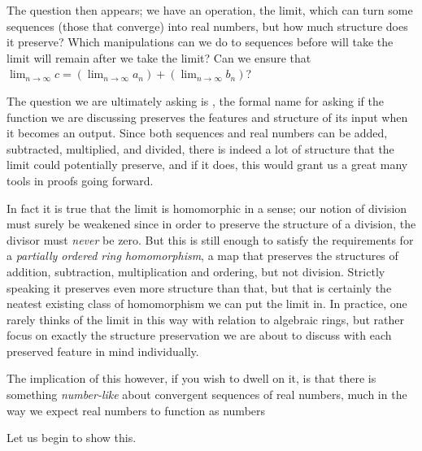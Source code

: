 \documentclass[11pt]{article}
\begin{document}
The question then appears; we have an operation, the limit, which can turn some sequences (those that converge) into real numbers, but how much structure does it preserve? Which manipulations can we do to sequences before will take the limit will remain after we take the limit? Can we ensure that $\lim_{n \to \infty} c = \left( \lim_{n \to \infty} a_n \right) + \left( \lim_{n \to \infty} b_n \right)$?

The question we are ultimately asking is , the formal name for asking if the function we are discussing preserves the features and structure of its input when it becomes an output. Since both sequences and real numbers can be added, subtracted, multiplied, and divided, there is indeed a lot of structure that the limit could potentially preserve, and if it does, this would grant us a great many tools in proofs going forward.

In fact it is true that the limit is homomorphic in a sense; our notion of division must surely be weakened since in order to preserve the structure of a division, the divisor must \emph{never} be zero. But this is still enough to satisfy the requirements for a \emph{partially ordered ring homomorphism}, a map that preserves the structures of addition, subtraction, multiplication and ordering, but not division. Strictly speaking it preserves even more structure than that, but that is certainly the neatest existing class of homomorphism we can put the limit in. In practice, one rarely thinks of the limit in this way with relation to algebraic rings, but rather focus on exactly the structure preservation we are about to discuss with each preserved feature in mind individually.

The implication of this however, if you wish to dwell on it, is that there is something \emph{number-like} about convergent sequences of real numbers, much in the way we expect real numbers to function as numbers

Let us begin to show this.
\end{document}
